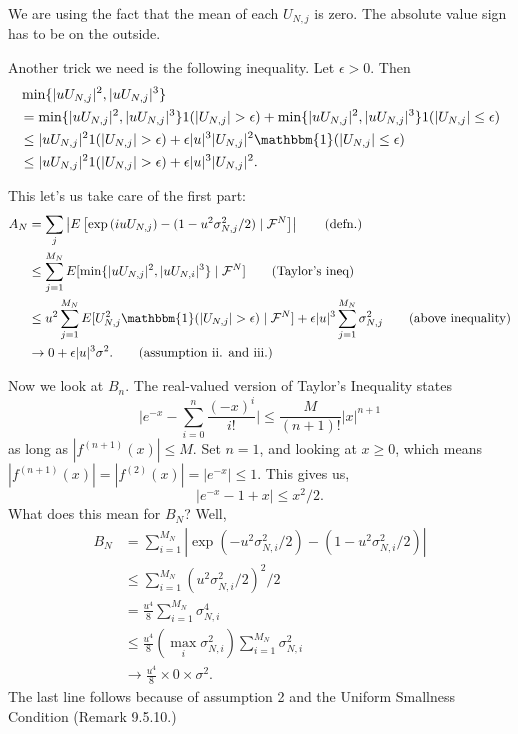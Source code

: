 \documentclass{article}
\begin{document}
We are using the fact that the mean of each $U_{N,j}$ is zero. The absolute value sign has to be on the outside.

Another trick we need is the following inequality. Let $\epsilon > 0$. Then
\begin{align*}
&\min\{|uU_{N,j} |^2, |uU_{N,j}|^3 \} \\
&=\min\{|uU_{N,j} |^2, |uU_{N,j}|^3 \}  1(|U_{N,j}| > \epsilon) + \min\{|uU_{N,j} |^2, |uU_{N,j}|^3 \}  1(|U_{N,j}| \le \epsilon) \\
&\le |uU_{N,j} |^2 1(|U_{N,j}| > \epsilon) + \epsilon|u|^3 |U_{N,j}|^2  \mathbbm{1}(|U_{N,j}| \le \epsilon) \\
&\le |uU_{N,j} |^2 1(|U_{N,j}| > \epsilon) + \epsilon|u|^3 |U_{N,j}|^2. 
\end{align*}


This let's us take care of the first part:
\begin{align*}
A_N &= \sum_j \left| E\left[   \exp\left( i u U_{N,j} \right)  - (1 - u^2 \sigma^2_{N,j}/2) \mid \mathcal{F}^N \right] \right| \tag{defn.} \\
&\le \sum_{j=1}^{M_N} E[ \min\{|uU_{N,j} |^2, |uU_{N,i}|^3 \} \mid \mathcal{F}^N ] \tag{Taylor's ineq} \\
&\le u^2 \sum_{j=1}^{M_N} E[ U_{N,j}^2 \mathbbm{1}(|U_{N,j}| > \epsilon) \mid \mathcal{F}^N ] + \epsilon |u|^3 \sum_{j=1}^{M_N} \sigma^2_{N,j} \tag{above inequality} \\
&\to 0 + \epsilon |u|^3 \sigma^2. \tag{assumption ii. and iii.}
\end{align*}

Now we look at $B_n$. The real-valued version of Taylor's Inequality states
\[
\bigg\rvert e^{-x} - \sum_{i=0}^n \frac{(-x)^i}{i!}\bigg\rvert \le \frac{M}{(n+1)!} | x|^{n+1}
\]
as long as $|f^{(n+1)}(x)| \le M$. Set $n=1$, and looking at $x \ge 0$, which means $|f^{(n+1)}(x)| = |f^{(2)}(x)| = |e^{-x}| \le 1$. This gives us, 
\[
|e^{-x} - 1 + x  | \le x^2/2.
\]
What does this mean for $B_N$? Well,
\begin{align*}
B_N &= \sum_{i=1}^{M_N} |\exp(-u^2 \sigma^2_{N,i}/2) - (1-u^2 \sigma^2_{N,i}/2)| \tag{defn.} \\
&\le \sum_{i=1}^{M_N} \left(u^2 \sigma^2_{N,i}/2 \right)^2/2 \tag{real-valued Taylor's}\\
&= \frac{u^4}{8} \sum_{i=1}^{M_N} \sigma^4_{N,i} \\
&\le \frac{u^4}{8} \left(\max_i \sigma^2_{N,i} \right)\sum_{i=1}^{M_N} \sigma^2_{N,i} \tag{see below} \\
&\to \frac{u^4}{8} \times 0 \times \sigma^2.
\end{align*}
The last line follows because of assumption 2 and the Uniform Smallness Condition (Remark 9.5.10.) 
\end{document}
